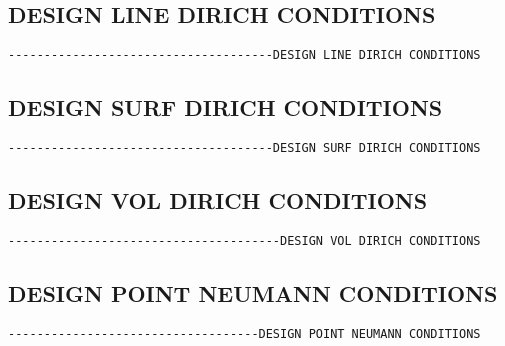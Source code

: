 \subsection{DESIGN LINE DIRICH CONDITIONS}
\begin{verbatim}
-------------------------------------DESIGN LINE DIRICH CONDITIONS
\end{verbatim}



\subsection{DESIGN SURF DIRICH CONDITIONS}
\begin{verbatim}
-------------------------------------DESIGN SURF DIRICH CONDITIONS
\end{verbatim}



\subsection{DESIGN VOL DIRICH CONDITIONS}
\begin{verbatim}
--------------------------------------DESIGN VOL DIRICH CONDITIONS
\end{verbatim}



\subsection{DESIGN POINT NEUMANN CONDITIONS}
\begin{verbatim}
-----------------------------------DESIGN POINT NEUMANN CONDITIONS
\end{verbatim}



